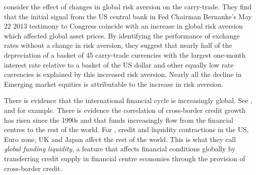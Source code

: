 \documentclass[12pt, a4paper, oneside]{article} %
\begin{document}
\citet{NYFedtaper} consider the effect of changes in global risk aversion on the carry-trade.  They find that the initial signal from the US central bank in Fed Chairman Bernanke's May 22 2013 testimony to Congress coincide with an increase in global risk aversion which affected global asset prices. %
By identifying the performance of exchange rates without a change in risk aversion, they suggest that nearly half of the depreciation of a basket of 45 carry-trade currencies with the largest one-month interest rate relative to a basket of the US dollar and other equally low rate currencies is explained by this increased risk aversion. Nearly all the decline in Emerging market equities is attributable to the increase in risk aversion.

There is evidence that the international financial cycle is increasingly global.  See \citet{Rey2013}, \citet{Obstfeld2014} and \citet{Bruno2014} for example.  %
There is evidence the correlation of cross-border credit growth has risen since the 1990s and that funds increasingly flow from the financial centres to the rest of the world. For \citet{Cerutti2014}, credit and liquidity contractions in  the US, Euro zone, UK and Japan affect the rest of the world.   This is what they call \emph{global funding liquidity}, a feature that affects financial conditions globally by transferring credit supply in financial centre economies through the provision of cross-border credit.



\end{document}
